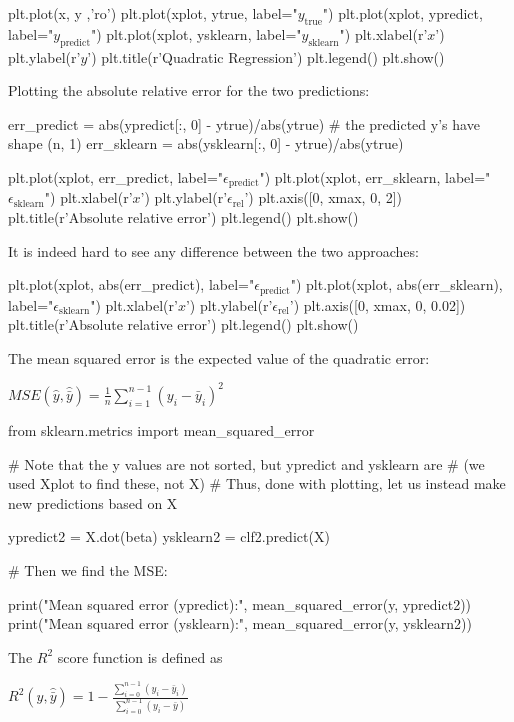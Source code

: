 \documentclass[%
oneside,                 %
final,                   %
10pt]{article}
\begin{document}
plt.plot(x, y ,'ro')
plt.plot(xplot, ytrue, label="$y_{\mathrm{true}}$")
plt.plot(xplot, ypredict, label="$y_{\mathrm{predict}}$")
plt.plot(xplot, ysklearn, label="$y_{\mathrm{sklearn}}$")
plt.xlabel(r'$x$')
plt.ylabel(r'$y$')
plt.title(r'Quadratic Regression')
plt.legend()
plt.show()
\epycod

Plotting the absolute relative error for the two predictions:


\bpycod
err_predict = abs(ypredict[:, 0] - ytrue)/abs(ytrue) # the predicted y's have shape (n, 1)
err_sklearn = abs(ysklearn[:, 0] - ytrue)/abs(ytrue)

plt.plot(xplot, err_predict, label="$\epsilon_{\mathrm{predict}}$")
plt.plot(xplot, err_sklearn, label="$\epsilon_{\mathrm{sklearn}}$")
plt.xlabel(r'$x$')
plt.ylabel(r'$\epsilon_{\mathrm{rel}}$')
plt.axis([0, xmax, 0, 2])
plt.title(r'Absolute relative error')
plt.legend()
plt.show()
\epycod

It is indeed hard to see any difference between the two approaches:


\bpycod
plt.plot(xplot, abs(err_predict), label="$\epsilon_{\mathrm{predict}}$")
plt.plot(xplot, abs(err_sklearn), label="$\epsilon_{\mathrm{sklearn}}$")
plt.xlabel(r'$x$')
plt.ylabel(r'$\epsilon_{\mathrm{rel}}$')
plt.axis([0, xmax, 0, 0.02])
plt.title(r'Absolute relative error')
plt.legend()
plt.show()
\epycod

The mean squared error is the expected value of the quadratic error:

$MSE\left(\hat{y}, \hat{\bar{y}}\right) = \frac{1}{n}\sum\limits_{i=1}^{n-1}\left(y_i - \bar{y}_i\right)^2$


\bpycod
from sklearn.metrics import mean_squared_error

# Note that the y values are not sorted, but ypredict and ysklearn are
# (we used Xplot to find these, not X)
# Thus, done with plotting, let us instead make new predictions based on X

ypredict2 = X.dot(beta)
ysklearn2 = clf2.predict(X)

# Then we find the MSE:

print("Mean squared error (ypredict):", mean_squared_error(y, ypredict2))
print("Mean squared error (ysklearn):", mean_squared_error(y, ysklearn2))
\epycod

The $R^2$ score function is defined as

$R^2\left(\hat{y}, \hat{\bar{y}}\right) = 1 - \frac{\sum\limits_{i=0}^{n-1}\left(y_i - \bar{y}_i\right)}{\sum\limits_{i=0}^{n-1}\left(y_i - \bar{y}\right)}$
\end{document}
